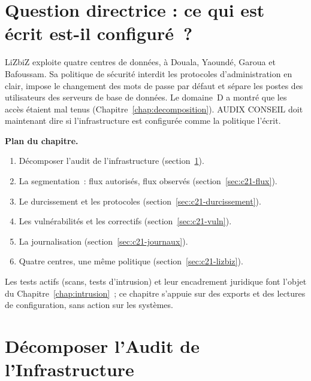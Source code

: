 \bigskip

\section*{Question directrice : ce qui est écrit est-il configuré~?}

LiZbiZ exploite quatre centres de données, à Douala, Yaoundé, Garoua et
Bafoussam. Sa politique de sécurité interdit les protocoles
d'administration en clair, impose le changement des mots de passe par
défaut et sépare les postes des utilisateurs des serveurs de base de
données. Le domaine~D a montré que les accès étaient mal tenus
(Chapitre~\ref{chap:decomposition}). AUDIX CONSEIL doit maintenant dire si
l'infrastructure est configurée comme la politique l'écrit.

\medskip
\textbf{Plan du chapitre.}
\begin{enumerate}
    \item Décomposer l'audit de l'infrastructure (section~\ref{sec:c21-decomposer}).
    \item La segmentation~: flux autorisés, flux observés
          (section~\ref{sec:c21-flux}).
    \item Le durcissement et les protocoles (section~\ref{sec:c21-durcissement}).
    \item Les vulnérabilités et les correctifs (section~\ref{sec:c21-vuln}).
    \item La journalisation (section~\ref{sec:c21-journaux}).
    \item Quatre centres, une même politique (section~\ref{sec:c21-lizbiz}).
\end{enumerate}
Les tests actifs (scans, tests d'intrusion) et leur encadrement juridique
font l'objet du Chapitre~\ref{chap:intrusion}~; ce chapitre s'appuie sur
des exports et des lectures de configuration, sans action sur les systèmes.

\separateur

\section{Décomposer l'Audit de l'Infrastructure}
\label{sec:c21-decomposer}

